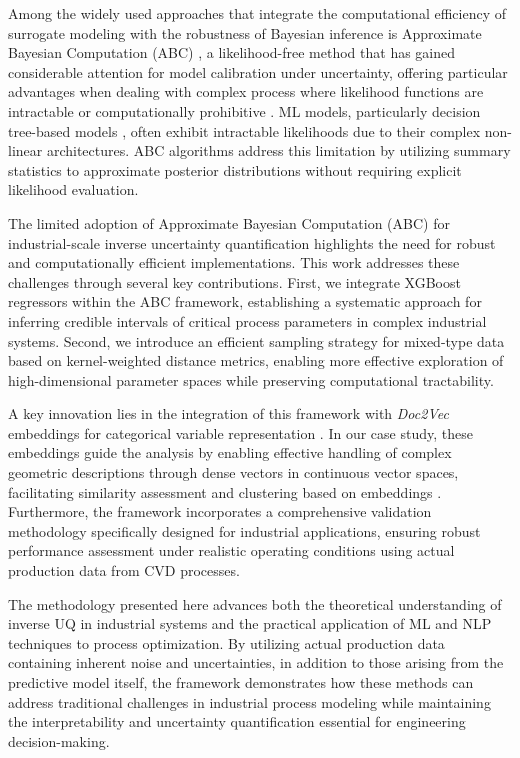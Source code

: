 \documentclass{article}
\begin{document}
	Among the widely used approaches that integrate the computational efficiency of surrogate modeling with the robustness of Bayesian inference is Approximate Bayesian Computation (ABC) \cite{Tavare1997, Beaumont2002, Marjoram2003}, a likelihood-free method that has gained considerable attention for model calibration under uncertainty, offering particular advantages when dealing with complex process where likelihood functions are intractable or computationally prohibitive \cite{Ratmann2009}. ML models, particularly decision tree-based models \cite{chenXGBoostScalableTree2016}, often exhibit intractable likelihoods due to their complex non-linear architectures. ABC algorithms address this limitation by utilizing summary statistics to approximate posterior distributions without requiring explicit likelihood evaluation. 
	
	The limited adoption of Approximate Bayesian Computation (ABC) for industrial-scale inverse uncertainty quantification highlights the need for robust and computationally efficient implementations. This work addresses these challenges through several key contributions. First, we integrate XGBoost regressors within the ABC framework, establishing a systematic approach for inferring credible intervals of critical process parameters in complex industrial systems. Second, we introduce an efficient sampling strategy for mixed-type data based on kernel-weighted distance metrics, enabling more effective exploration of high-dimensional parameter spaces while preserving computational tractability.
	
	A key innovation lies in the integration of this framework with \textit{Doc2Vec} embeddings for categorical variable representation \cite{ref:Doc2Vec, lau2016empiricalevaluationdoc2vecpractical}. In our case study, these embeddings guide the analysis by enabling effective handling of complex geometric descriptions through dense vectors in continuous vector spaces, facilitating similarity assessment and clustering based on embeddings \cite{8718215}. Furthermore, the framework incorporates a comprehensive validation methodology specifically designed for industrial applications, ensuring robust performance assessment under realistic operating conditions using actual production data from CVD processes.
	
	The methodology presented here advances both the theoretical understanding of inverse UQ in industrial systems and the practical application of ML and NLP techniques to process optimization. By utilizing actual production data containing inherent noise and uncertainties, in addition to those arising from the predictive model itself, the framework demonstrates how these methods can address traditional challenges in industrial process modeling while maintaining the interpretability and uncertainty quantification essential for engineering decision-making.
	
\end{document}
